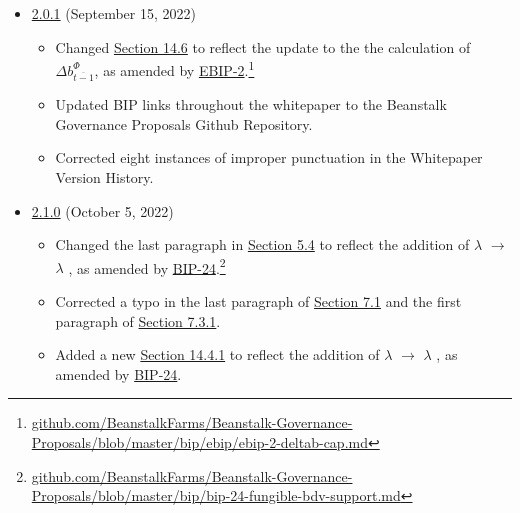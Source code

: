 \documentclass[class=article, crop=false]{standalone}
\begin{document}
\begin{itemize}[topsep=0pt, itemsep=3pt,leftmargin=16pt]
\begin{itemize}
    \end{itemize}  
        \item \href{https://github.com/BeanstalkFarms/Beanstalk/blob/master/version-history/beanstalk2_0_1.pdf}{2.0.1} (September 15, 2022)
    \begin{itemize}
        \item Changed \hyperlink{subsection.14.6}{Section 14.6} to reflect the update to the the calculation of $\Delta b_{\overline{t-1}}^{\Phi}$, as amended by \href{https://github.com/BeanstalkFarms/Beanstalk-Governance-Proposals/blob/master/bip/ebip/ebip-2-deltab-cap.md}{EBIP-2}.\footnote{\href{https://github.com/BeanstalkFarms/Beanstalk-Governance-Proposals/blob/master/bip/ebip/ebip-2-deltab-cap.md}{github.com/BeanstalkFarms/Beanstalk-Governance-Proposals/blob/master/bip/ebip/ebip-2-deltab-cap.md}}
        \item Updated BIP links throughout the whitepaper to the Beanstalk Governance Proposals Github Repository.
        \item Corrected eight instances of improper punctuation in the Whitepaper Version History.
    \end{itemize}  
        \item \href{https://github.com/BeanstalkFarms/Beanstalk/blob/master/version-history/beanstalk2_1_0.pdf}{2.1.0} (October 5, 2022)
    \begin{itemize}
        \item Changed the last paragraph in \hyperlink{subsection.5.4}{Section 5.4} to reflect the addition of $\lambda$ $\rightarrow$ $\lambda$ , as amended by \href{https://github.com/BeanstalkFarms/Beanstalk-Governance-Proposals/blob/master/bip/bip-24-fungible-bdv-support.md}{BIP-24}.\footnote{\href{https://github.com/BeanstalkFarms/Beanstalk-Governance-Proposals/blob/master/bip/bip-24-fungible-bdv-support.md}{github.com/BeanstalkFarms/Beanstalk-Governance-Proposals/blob/master/bip/bip-24-fungible-bdv-support.md}}
        \item Corrected a typo in the last paragraph of \hyperlink{subsection.7.1}{Section 7.1} and the first paragraph of \hyperlink{subsubsection.7.3.1}{Section 7.3.1}.
        \item Added a new \hyperlink{subsubsection.14.4.1}{Section 14.4.1} to reflect the addition of $\lambda$ $\rightarrow$ $\lambda$ , as amended by \href{https://github.com/BeanstalkFarms/Beanstalk-Governance-Proposals/blob/master/bip/bip-24-fungible-bdv-support.md}{BIP-24}.

\end{itemize}
\end{itemize}
\end{document}
